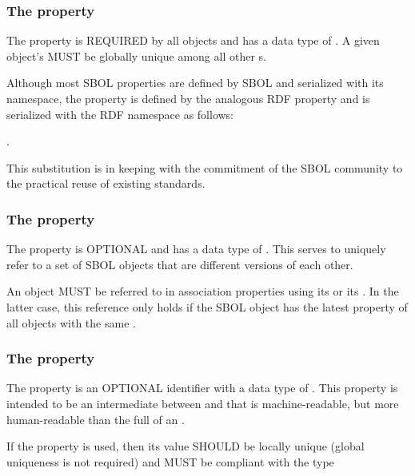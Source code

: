 \subsubsection*{The  property}
\label{sec:identity}
The  property is REQUIRED by all  objects and has a data type of . A given  object's   MUST be globally unique among all other  s. 

Although most SBOL properties are defined by SBOL and serialized with its namespace, the  property is defined by the analogous RDF  property and is serialized with the RDF namespace as follows:

.

This substitution is in keeping with the commitment of the SBOL community to the practical reuse of existing standards.

\subsubsection*{The  property}
\label{sec:persistentIdentity}
The  property is OPTIONAL and has a data type of . This  serves to uniquely refer to a set of SBOL objects that are different versions of each other. 

An  object MUST be referred to in association properties using its   or its  . In the latter case, this reference only holds if the SBOL object has the latest  property of all objects with the same .

\subsubsection*{The  property}
\label{sec:displayId}
The  property is an OPTIONAL identifier with a data type of . This property is intended to be an intermediate between  and  that is machine-readable, but more human-readable than the full  of an . 

If the  property is used, then its  value SHOULD be locally unique (global uniqueness is not required) and MUST be compliant with the type 

